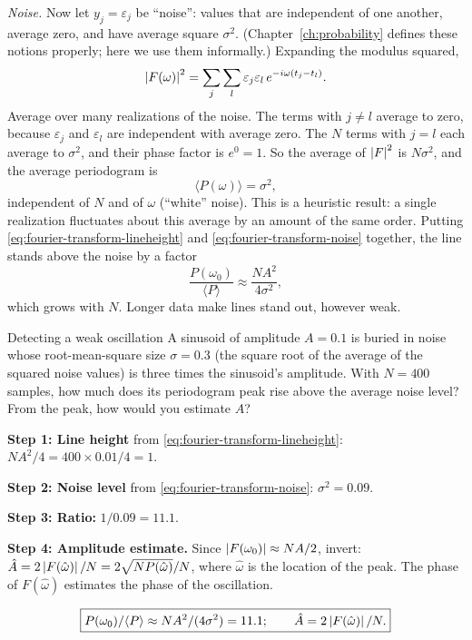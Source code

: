 \emph{Noise.} Now let $y_j=\varepsilon_j$ be ``noise'': values that are independent of one another, average zero, and have average square $\sigma^2$. (Chapter~\ref{ch:probability} defines these notions properly; here we use them informally.) Expanding the modulus squared,
\begin{equation}
\left\lvert F(\omega)\right\rvert^2=\sum_{j}\sum_{l}\varepsilon_j\varepsilon_l\,e^{-i\omega(t_j-t_l)} .
\end{equation}
Average over many realizations of the noise. The terms with $j\neq l$ average to zero, because $\varepsilon_j$ and $\varepsilon_l$ are independent with average zero. The $N$ terms with $j=l$ each average to $\sigma^2$, and their phase factor is $e^0=1$. So the average of $\left\lvert F\right\rvert^2$ is $N\sigma^2$, and the average periodogram is
\begin{equation}
\langle P(\omega)\rangle=\sigma^2,
\label{eq:fourier-transform-noise}
\end{equation}
independent of $N$ and of $\omega$ (``white'' noise). This is a heuristic result: a single realization fluctuates about this average by an amount of the same order. Putting \eqref{eq:fourier-transform-lineheight} and \eqref{eq:fourier-transform-noise} together, the line stands above the noise by a factor
\begin{equation}
\frac{P(\omega_0)}{\langle P\rangle}\approx\frac{NA^2}{4\sigma^2},
\label{eq:fourier-transform-snr}
\end{equation}
which grows with $N$. Longer data make lines stand out, however weak.

\begin{sample}{Detecting a weak oscillation}
A sinusoid of amplitude $A=0.1$ is buried in noise whose root-mean-square size $\sigma=0.3$ (the square root of the average of the squared noise values) is three times the sinusoid's amplitude. With $N=400$ samples, how much does its periodogram peak rise above the average noise level? From the peak, how would you estimate $A$?

\textbf{Step 1: Line height} from \eqref{eq:fourier-transform-lineheight}: $NA^2/4=400\times0.01/4=1$.

\textbf{Step 2: Noise level} from \eqref{eq:fourier-transform-noise}: $\sigma^2=0.09$.

\textbf{Step 3: Ratio:} $1/0.09=11.1$.

\textbf{Step 4: Amplitude estimate.} Since $\left\lvert F(\omega_0)\right\rvert\approx NA/2$, invert: $\hat A=2\left\lvert F(\hat\omega)\right\rvert/N=2\sqrt{N P(\hat\omega)}/N$, where $\hat\omega$ is the location of the peak. The phase of $F(\hat\omega)$ estimates the phase of the oscillation.

\[\boxed{P(\omega_0)/\langle P\rangle\approx NA^2/(4\sigma^2)=11.1;\qquad\hat A=2\left\lvert F(\hat\omega)\right\rvert/N.}\]
\end{sample}

